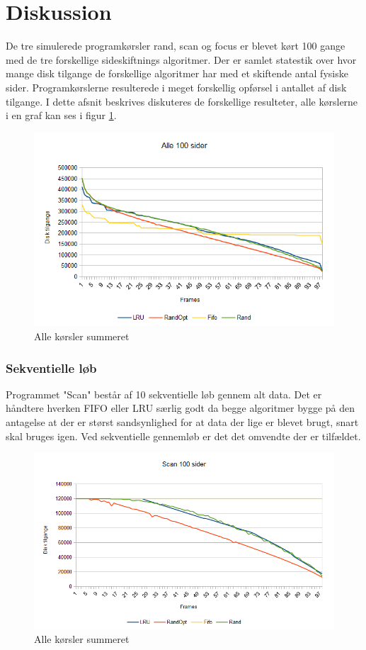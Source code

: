 \section{Diskussion}
De tre simulerede programkørsler rand, scan og focus er blevet kørt 100 gange med de tre forskellige sideskiftnings algoritmer. Der er samlet statestik over hvor mange disk tilgange de forskellige algoritmer har med et skiftende antal fysiske sider. Programkørslerne resulterede i meget forskellig opførsel i antallet af disk tilgange. I dette afsnit beskrives diskuteres de forskellige resulteter, alle kørslerne i en graf kan ses i figur \ref{fig:all}.

\begin{figure}[ht]
\centerline{\includegraphics[scale=1]{graph/stat_all}}
\FloatBarrier
\caption{Alle kørsler summeret}
\label{fig:all}
\end{figure}

\subsubsection{Sekventielle løb}
Programmet "Scan" består af 10 sekventielle løb gennem alt data. Det er håndtere hverken FIFO eller LRU særlig godt da begge algoritmer bygge på den antagelse at der er størst sandsynlighed for at data der lige er blevet brugt, snart skal bruges igen. Ved sekventielle gennemløb er det det omvendte der er tilfældet. 

\begin{figure}[ht]
\centerline{\includegraphics[scale=1]{graph/stat_scan}}
\FloatBarrier
\caption{Alle kørsler summeret}
\label{fig:scan}
\end{figure}


